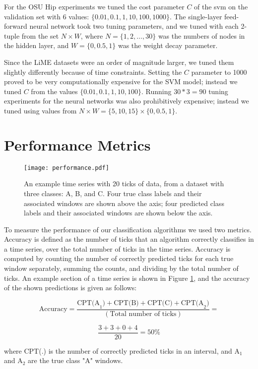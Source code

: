 For the OSU Hip experiments we tuned the
cost parameter $C$ of the svm on the validation set with 6 values:
$\{0.01,0.1,1,10,100,1000\}$. The single-layer feed-forward neural network took
two tuning parameters, and we tuned with each 2-tuple from the set $N \times W$,
where $N = \{1,2, \ldots, 30\}$ was the numbers of nodes in the hidden layer, and 
$W = \{0,0.5,1\}$ was the weight decay parameter.

Since the LiME datasets were an order of magnitude larger, we tuned them
slightly differently because of time constraints. Setting the $C$ parameter to
1000 proved to be very computationally expensive for the SVM model; instead we tuned $C$
from the values $\{0.01,0.1,1,10,100\}$. Running $30*3=90$ tuning experiments
for the neural networks was also prohibitively expensive; instead we tuned using
values from $N \times W = \{5,10,15\} \times \{0,0.5,1\}$.




\section{Performance Metrics}
\begin{figure}[h]
 \centering
 \texttt{[image: performance.pdf]}
 \caption{An example time series with 20 ticks of data, from a dataset with
  three classes: A, B, and C. Four true class labels and their associated
  windows are shown above the axis; four predicted class
  labels and their associated windows are shown below the axis.}
 \label{fig:performance}
\end{figure}

To measure the performance of our classification algorithms we used
two metrics. Accuracy is defined as the number of ticks that an algorithm
correctly classifies in a time series, over the total number of ticks
in the time series. Accuracy is computed by counting the number of
correctly predicted ticks for each true window separately, summing the counts,
and dividing by the total number of ticks. An example section of a time series
is shown in Figure \ref{fig:performance}, and the accuracy of the shown
predictions is given as follows:

\[
\text{Accuracy} = \frac{\text{CPT(A}_1) + \text{CPT(B)} + \text{CPT(C)} + \text{CPT(A}_2)}{(\text{Total number of ticks})} =
\]

\[
\frac{3 + 3 + 0 + 4}{20} = 50\%
\]

where CPT(.) is the number of correctly predicted ticks in an interval, and
A$_1$ and A$_2$ are the true class "A" windows.

